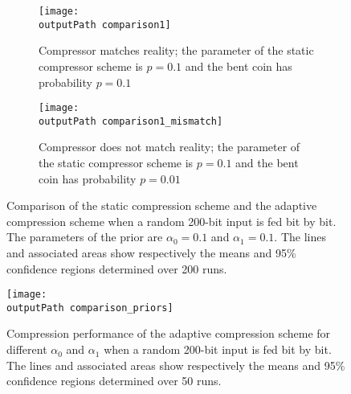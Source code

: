 \documentclass[letterpaper,11pt]{extarticle}
\newcommand{\outputPath}{output/}
\begin{document}
\begin{figure}[ht]
    \centering
    \begin{subfigure}{.49\linewidth}
        \texttt{[image: \\outputPath comparison1]}
        \caption{Compressor matches reality; the parameter of the static compressor scheme is $p=0.1$ and the bent coin has probability $p=0.1$}
    \end{subfigure}
    \begin{subfigure}{.49\linewidth}
        \texttt{[image: \\outputPath comparison1\_mismatch]}
        \caption{Compressor does not match reality; the parameter of the static compressor scheme is $p=0.1$ and the bent coin has probability $p=0.01$}
    \end{subfigure}
    \caption{Comparison of the static compression scheme and the adaptive compression scheme when a random 200-bit input is fed bit by bit. The parameters of the prior are $\alpha_0=0.1$ and $\alpha_1=0.1$. The lines and associated areas show respectively the means and 95\% confidence regions determined over 200 runs.}
    \label{fig:comparison_mismatch}
\end{figure}


\begin{figure}[ht]
    \centering
    \texttt{[image: \\outputPath comparison\_priors]}
    \caption{Compression performance of the adaptive compression scheme for different $\alpha_0$ and $\alpha_1$ when a random 200-bit input is fed bit by bit. The lines and associated areas show respectively the means and 95\% confidence regions determined over 50 runs.}
    \label{fig:comparison_priors}
\end{figure}

\endgroup
\printbibliography
%
%
\end{document}
